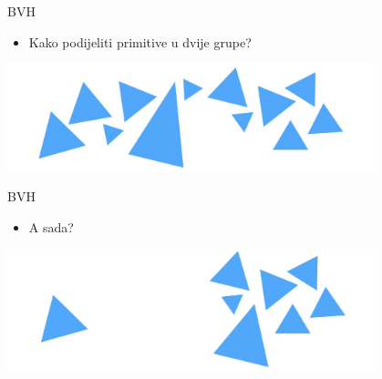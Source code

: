 \documentclass[9pt]{beamer}
\begin{document}
\begin{frame}{BVH}
	\begin{itemize}
		\item Kako podijeliti primitive u dvije grupe?
	\end{itemize}
	\begin{center}
		\includegraphics[width=0.8\textwidth]{slike/slide_026.jpg}
	\end{center}
\end{frame}

\begin{frame}{BVH}
	\begin{itemize}
		\item A sada?
	\end{itemize}
	\begin{center}
		\includegraphics[width=0.8\textwidth]{slike/slide_027.jpg}
	\end{center}
\end{frame}
\end{document}
